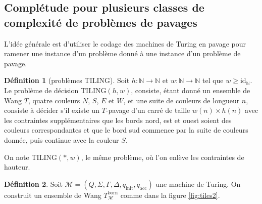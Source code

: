 \documentclass{scrartcl}
\renewcommand{\ge}{\geqslant}
\newcommand{\N}{\mathbb N}
\newcommand{\id}{\mathrm{id}}
\theoremstyle{definition}
\newtheorem*{definition}{Définition}
\theoremstyle{remark}
\begin{document}
\subsection{Complétude pour plusieurs classes de complexité de problèmes de pavages}

L'idée générale est d'utiliser le codage des machines de Turing en pavage pour ramener une instance d'un problème donné à une instance d'un problème de pavage.  

\begin{definition}[problèmes $\mathrm{TILING}$]
  Soit $h:\N\to\N$ et $w:\N\to\N$ tel que $w\ge\id_\N$. Le problème de décision $\mathrm{TILING}(h,w)$, consiste, étant donné un ensemble de Wang $T$, quatre couleurs $N$, $S$, $E$ et $W$, et une suite de couleurs de longueur $n$, consiste à décider s'il existe un $T$-pavage d'un carré de taille $w(n)\times h(n)$ avec les contraintes supplémentaires que les bords nord, est et ouest soient des couleurs correspondantes et que le bord sud commence par la suite de couleurs donnée, puis continue avec la couleur $S$.

  On note $\mathrm{TILING}(*,w)$, le même problème, où l'on enlève les contraintes de hauteur.
\end{definition}

\begin{definition}
  Soit $\mathcal M=(Q,\Sigma,\Gamma, \Delta, q_\mathrm{init}, q_\mathrm{acc})$ une machine de Turing. On construit un ensemble de Wang $T^{\mathrm{born}}_\mathcal M$ comme dans la figure \ref{fig:tiles2}.
\end{definition}
\end{document}
